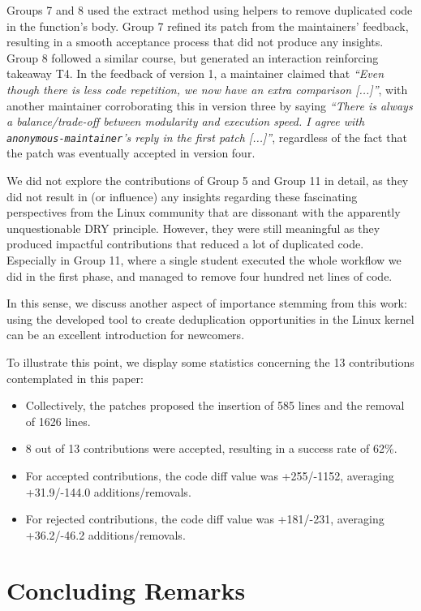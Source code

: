 \documentclass[10pt,conference]{IEEEtran}
\begin{document}
Groups 7 and 8 used the extract method using helpers to remove duplicated code in the function's body. Group 7 refined its patch from the maintainers' feedback, resulting in a smooth acceptance process that did not produce any insights. Group 8 followed a similar course, but generated an interaction reinforcing takeaway T4. In the feedback of version 1, a maintainer claimed that \textit{``Even though there is less code repetition, we now have an extra comparison [...]''}, with another maintainer corroborating this in version three by saying \textit{``There is always a balance/trade-off between modularity and execution speed. I agree with \texttt{anonymous-maintainer}'s reply in the first patch [...]''}, regardless of the fact that the patch was eventually accepted in version four.

We did not explore the contributions of Group 5 and Group 11 in detail, as they did not result in (or influence) any insights regarding these fascinating perspectives from the Linux community that are dissonant with the apparently unquestionable DRY principle. However, they were still meaningful as they produced impactful contributions that reduced a lot of duplicated code. Especially in Group 11, where a single student executed the whole workflow we did in the first phase, and managed to remove four hundred net lines of code.

In this sense, we discuss another aspect of importance stemming from this work: using the developed tool to create deduplication opportunities in the Linux kernel can be an excellent introduction for newcomers.

To illustrate this point, we display some statistics concerning the 13 contributions contemplated in this paper:

\begin{itemize}
  \item Collectively, the patches proposed the insertion of 585 lines and the removal of 1626 lines.
  \item 8 out of 13 contributions were accepted, resulting in a success rate of 62\%.
  \item For accepted contributions, the code diff value was +255/-1152, averaging +31.9/-144.0 additions/removals.
  \item For rejected contributions, the code diff value was +181/-231, averaging +36.2/-46.2 additions/removals.
\end{itemize}


\section{Concluding Remarks}
\end{document}
